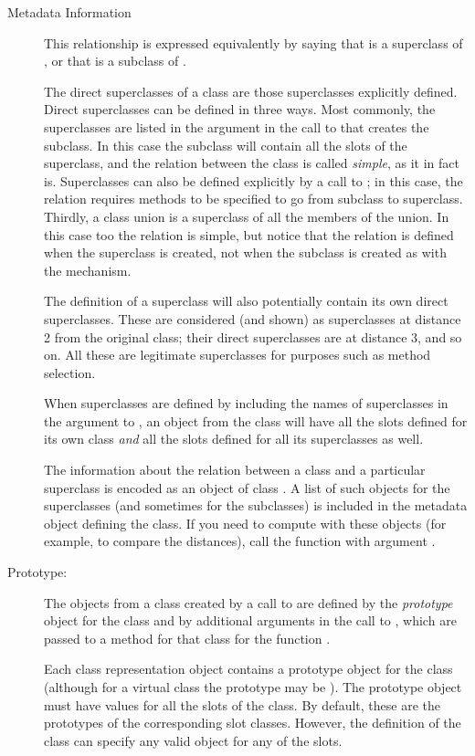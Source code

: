 \begin{Section}{Metadata Information}
\begin{description}
This relationship is
expressed equivalently by saying that  is a superclass of
, or that  is a subclass of
.

The direct superclasses of a class are those superclasses
explicitly defined.   Direct superclasses can be defined in
three ways.  Most commonly, the superclasses are listed in the
 argument in the call to 
that creates the subclass.   In this case the subclass will
contain all the slots of the superclass, and the relation
between the class is called \emph{simple}, as it in fact is.
Superclasses can also be defined
explicitly by a call to ; in this case, the
relation requires methods to be specified to go from subclass to
superclass.   Thirdly, a class union is a superclass of all the
members of the union.  In this case too the relation is simple,
but notice that the relation is defined when the superclass is
created, not when the subclass is created as with the
 mechanism.

The definition of a superclass will also potentially contain
its own direct superclasses.  These are considered (and shown) as
superclasses at distance 2 from the original class; their direct
superclasses are at distance 3, and so on.  All these are
legitimate superclasses for purposes such as method selection.

When superclasses are defined  by including the names of
superclasses in the  argument to
,   an object from the class will have all the slots
defined for its own class \emph{and} all the slots defined for all
its superclasses as well.

The information about the relation between a class and a
particular superclass is encoded as an object of class
.  A list of such objects for
the superclasses (and sometimes for the subclasses) is included in
the metadata object defining the class.  If you need to compute
with these objects (for example, to compare the distances), call
the function  with argument .


\item[Prototype:] 

The objects from a class created by a call to
are defined by the \emph{prototype} object for the class and by
additional arguments in the call to , which are
passed to a method for that class for the function
.

Each class representation object contains a prototype object
for the class (although for a virtual class the prototype may be
). The prototype object must have values for all the
slots of the class.
By default, these are the prototypes of
the corresponding slot classes.  However, the
definition of the class can specify any valid object for any of
the slots.


\end{description}

\end{Section}
